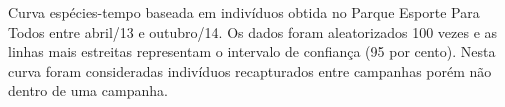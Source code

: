 \label{fig:2.1.6} Curva espécies-tempo baseada em indivíduos obtida no Parque Esporte Para Todos entre abril/13 e outubro/14. Os dados foram aleatorizados 100 vezes e as linhas mais estreitas representam o intervalo de confiança (95 por cento). Nesta curva foram consideradas indivíduos recapturados entre campanhas porém não dentro de uma campanha.


